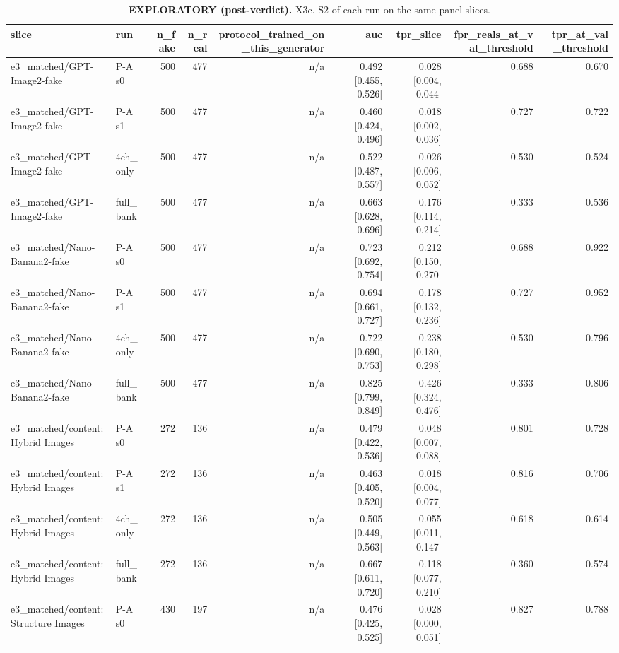\begin{table}[htbp]
\centering
\scriptsize
\caption{\textbf{EXPLORATORY (post-verdict).} X3c. S2 of each run on the same panel slices.}
\label{tab:x3c-s2-by-protocol}
\begin{tabular}{llrrrrrrr}
\toprule
slice & run & n\_fake & n\_real & protocol\_trained\_on\_this\_generator & auc & tpr\_slice & fpr\_reals\_at\_val\_threshold & tpr\_at\_val\_threshold \\
\midrule
e3\_matched/GPT-Image2-fake & P-A s0 & 500 & 477 & n/a & 0.492 [0.455, 0.526] & 0.028 [0.004, 0.044] & 0.688 & 0.670 \\
e3\_matched/GPT-Image2-fake & P-A s1 & 500 & 477 & n/a & 0.460 [0.424, 0.496] & 0.018 [0.002, 0.036] & 0.727 & 0.722 \\
e3\_matched/GPT-Image2-fake & 4ch\_only & 500 & 477 & n/a & 0.522 [0.487, 0.557] & 0.026 [0.006, 0.052] & 0.530 & 0.524 \\
e3\_matched/GPT-Image2-fake & full\_bank & 500 & 477 & n/a & 0.663 [0.628, 0.696] & 0.176 [0.114, 0.214] & 0.333 & 0.536 \\
e3\_matched/Nano-Banana2-fake & P-A s0 & 500 & 477 & n/a & 0.723 [0.692, 0.754] & 0.212 [0.150, 0.270] & 0.688 & 0.922 \\
e3\_matched/Nano-Banana2-fake & P-A s1 & 500 & 477 & n/a & 0.694 [0.661, 0.727] & 0.178 [0.132, 0.236] & 0.727 & 0.952 \\
e3\_matched/Nano-Banana2-fake & 4ch\_only & 500 & 477 & n/a & 0.722 [0.690, 0.753] & 0.238 [0.180, 0.298] & 0.530 & 0.796 \\
e3\_matched/Nano-Banana2-fake & full\_bank & 500 & 477 & n/a & 0.825 [0.799, 0.849] & 0.426 [0.324, 0.476] & 0.333 & 0.806 \\
e3\_matched/content:Hybrid Images & P-A s0 & 272 & 136 & n/a & 0.479 [0.422, 0.536] & 0.048 [0.007, 0.088] & 0.801 & 0.728 \\
e3\_matched/content:Hybrid Images & P-A s1 & 272 & 136 & n/a & 0.463 [0.405, 0.520] & 0.018 [0.004, 0.077] & 0.816 & 0.706 \\
e3\_matched/content:Hybrid Images & 4ch\_only & 272 & 136 & n/a & 0.505 [0.449, 0.563] & 0.055 [0.011, 0.147] & 0.618 & 0.614 \\
e3\_matched/content:Hybrid Images & full\_bank & 272 & 136 & n/a & 0.667 [0.611, 0.720] & 0.118 [0.077, 0.210] & 0.360 & 0.574 \\
e3\_matched/content:Structure Images & P-A s0 & 430 & 197 & n/a & 0.476 [0.425, 0.525] & 0.028 [0.000, 0.051] & 0.827 & 0.788 \\

\end{tabular}
\end{table}
